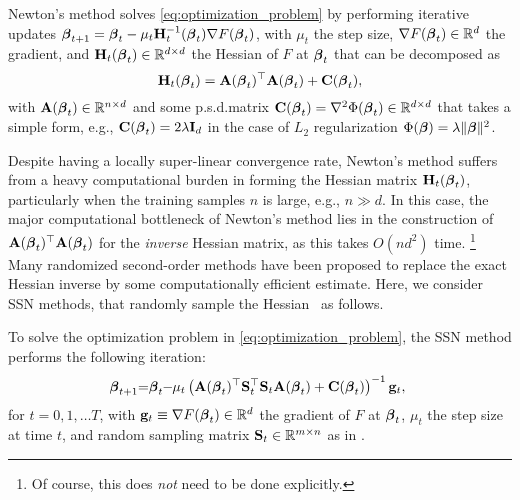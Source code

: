 \documentclass[11pt,a4paper]{article}
\begin{document}
Newton's method solves \eqref{eq:optimization_problem} by performing iterative updates $\boldsymbol{\beta}_{t+1}=\boldsymbol{\beta}_{t}- \mu_t \mathbf{H}_t^{-1}(\boldsymbol{\beta}_{t}) \nabla F(\boldsymbol{\beta}_{t})$, with $\mu_t$ the step size, $\nabla F(\boldsymbol{\beta}_{t}) \in {\mathbb{R}}^d$ the gradient, and $\mathbf{H}_t(\boldsymbol{\beta}_{t}) \in {\mathbb{R}}^{d\times d}$ the Hessian of $F$ at $\boldsymbol{\beta}_{t}$ that can be decomposed as
\begin{equation}
  \mathbf{H}_t(\boldsymbol{\beta}_{t})=\mathbf{A}(\boldsymbol{\beta}_{t})^\top\mathbf{A}(\boldsymbol{\beta}_{t}) +\mathbf{C}(\boldsymbol{\beta}_{t}),
\end{equation}
with $\mathbf{A}(\boldsymbol{\beta}_{t})\in {\mathbb{R}}^{n\times d}$ and some p.s.d.\@ matrix $\mathbf{C}(\boldsymbol{\beta}_{t})=\nabla^2\Phi(\boldsymbol{\beta}_t)\in {\mathbb{R}}^{d\times d}$ that takes a simple form, e.g., $\mathbf{C}(\boldsymbol{\beta}_t) = 2 \lambda \mathbf{I}_d$ in the case of $L_2$ regularization $\Phi(\boldsymbol{\beta}) = \lambda \| \boldsymbol{\beta} \|^2$.

Despite having a locally super-linear convergence rate, Newton's method suffers from a heavy computational burden in forming the Hessian matrix $\mathbf{H}_t(\boldsymbol{\beta}_{t})$, particularly when the training samples $n$ is large, e.g., $n \gg d$.
In this case, the major computational bottleneck of Newton's method lies in the construction of $\mathbf{A}(\boldsymbol{\beta}_{t})^\top \mathbf{A}(\boldsymbol{\beta}_{t})$ for the \emph{inverse} Hessian matrix, as this takes $O(nd^2)$ time.%
\footnote{Of course, this does \emph{not} need to be done explicitly.}
Many randomized second-order methods have been proposed to replace the exact Hessian inverse by some computationally efficient estimate.
Here, we consider SSN methods, that randomly sample the Hessian~\citep{yao2018inexact,roosta2019subsampled,xu2020newton} as follows.
\begin{definition}\label{def:sub-sampled_Newton}
To solve the optimization problem in \eqref{eq:optimization_problem}, the SSN method performs the following iteration:
\begin{align}\label{eq:newton-sub-sampled}
  \hspace{-1mm}
  \boldsymbol{\beta}_{t+1}
  \hspace{-1mm}
  =
  \hspace{-1mm} 
  \boldsymbol{\beta}_{t}
  \hspace{-1mm}
  -
  \hspace{-1mm}
  \mu_t \left(\mathbf{A}(\boldsymbol{\beta}_t)^\top\mathbf{S}_t^\top  \mathbf{S}_t \mathbf{A}(\boldsymbol{\beta}_t)+\mathbf{C}(\boldsymbol{\beta}_t) \right)^{-1}\mathbf{g}_t,
\end{align}
for  $t = 0,1,\ldots T$, with $\mathbf{g}_t \equiv \nabla F(\boldsymbol{\beta}_{t}) \in {\mathbb{R}}^{d}$ the gradient of $F$ at $\boldsymbol{\beta}_{t}$, $\mu_t$ the step size at time $t$, and random sampling matrix $\mathbf{S}_t \in {\mathbb{R}}^{m \times n}$ as in .
\end{definition}
\end{document}
